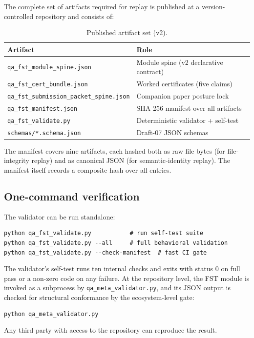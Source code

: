\documentclass[12pt,a4paper]{article}
\begin{document}
The complete set of artifacts required for replay is published at a
version-controlled repository and consists of:

\begin{table}[h]
\centering
\caption{Published artifact set (v2).}
\label{tab:artifacts}
\begin{tabular}{@{}ll@{}}
\toprule
\textbf{Artifact} & \textbf{Role} \\
\midrule
\texttt{qa\_fst\_module\_spine.json} & Module spine (v2 declarative contract) \\
\texttt{qa\_fst\_cert\_bundle.json} & Worked certificates (five claims) \\
\texttt{qa\_fst\_submission\_packet\_spine.json} & Companion paper posture lock \\
\texttt{qa\_fst\_manifest.json} & SHA-256 manifest over all artifacts \\
\texttt{qa\_fst\_validate.py} & Deterministic validator + self-test \\
\texttt{schemas/*.schema.json} & Draft-07 JSON schemas \\
\bottomrule
\end{tabular}
\end{table}

The manifest covers nine artifacts, each hashed both as raw file
bytes (for file-integrity replay) and as canonical JSON (for
semantic-identity replay). The manifest itself records a composite
hash over all entries.

\subsection{One-command verification}

The validator can be run standalone:
\begin{lstlisting}
python qa_fst_validate.py           # run self-test suite
python qa_fst_validate.py --all     # full behavioral validation
python qa_fst_validate.py --check-manifest  # fast CI gate
\end{lstlisting}
The validator's self-test runs ten internal checks and exits with
status 0 on full pass or a non-zero code on any failure. At the
repository level, the FST module is invoked as a subprocess by
\texttt{qa\_meta\_validator.py}, and its JSON output is checked for
structural conformance by the ecosystem-level gate:
\begin{lstlisting}
python qa_meta_validator.py
\end{lstlisting}
Any third party with access to the repository can reproduce the
result.
\end{document}
